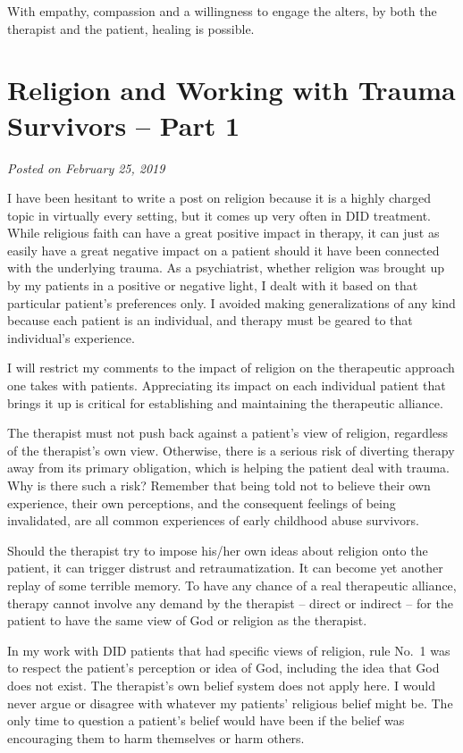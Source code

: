 \documentclass[]{book}
\begin{document}
With empathy, compassion and a willingness to engage the alters, by both the therapist and the patient, healing is possible.

\hypertarget{religion-and-working-with-trauma-survivors-part-1}{%
\section{Religion and Working with Trauma Survivors -- Part 1}\label{religion-and-working-with-trauma-survivors-part-1}}

\emph{Posted on February 25, 2019}

I have been hesitant to write a post on religion because it is a highly charged topic in virtually every setting, but it comes up very often in DID treatment. While religious faith can have a great positive impact in therapy, it can just as easily have a great negative impact on a patient should it have been connected with the underlying trauma. As a psychiatrist, whether religion was brought up by my patients in a positive or negative light, I dealt with it based on that particular patient's preferences only. I avoided making generalizations of any kind because each patient is an individual, and therapy must be geared to that individual's experience.

I will restrict my comments to the impact of religion on the therapeutic approach one takes with patients. Appreciating its impact on each individual patient that brings it up is critical for establishing and maintaining the therapeutic alliance.

The therapist must not push back against a patient's view of religion, regardless of the therapist's own view. Otherwise, there is a serious risk of diverting therapy away from its primary obligation, which is helping the patient deal with trauma. Why is there such a risk? Remember that being told not to believe their own experience, their own perceptions, and the consequent feelings of being invalidated, are all common experiences of early childhood abuse survivors.

Should the therapist try to impose his/her own ideas about religion onto the patient, it can trigger distrust and retraumatization. It can become yet another replay of some terrible memory. To have any chance of a real therapeutic alliance, therapy cannot involve any demand by the therapist -- direct or indirect -- for the patient to have the same view of God or religion as the therapist.

In my work with DID patients that had specific views of religion, rule No.~1 was to respect the patient's perception or idea of God, including the idea that God does not exist. The therapist's own belief system does not apply here. I would never argue or disagree with whatever my patients' religious belief might be. The only time to question a patient's belief would have been if the belief was encouraging them to harm themselves or harm others.
\end{document}
